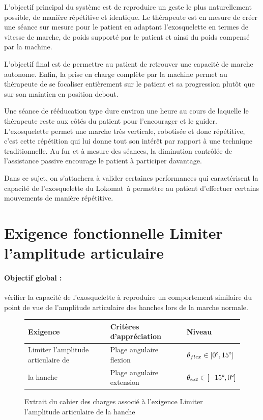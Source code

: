 L'objectif principal du système est de reproduire un geste le plus naturellement possible, de manière répétitive et identique. Le thérapeute est en mesure de créer une séance sur mesure pour le patient en adaptant l'exosquelette en termes de vitesse de marche, de poids supporté par le patient et ainsi du poids compensé par la machine.

L'objectif final est de permettre au patient de retrouver une capacité de marche autonome. Enfin, la prise en charge complète par la machine permet au thérapeute de se focaliser entièrement sur le patient et sa progression plutôt que sur son maintien en position debout.

Une séance de rééducation type dure environ une heure au cours de laquelle le thérapeute reste aux côtés du patient pour l'encourager et le guider. L'exosquelette permet une marche très verticale, robotisée et donc répétitive, c'est cette répétition qui lui donne tout son intérêt par rapport à une
technique traditionnelle. Au fur et à mesure des séances, la diminution contrôlée de l'assistance passive encourage le patient à participer davantage.

Dans ce sujet, on s'attachera à valider certaines performances qui caractérisent la capacité de l'exosquelette du Lokomat\textregistered\ à permettre au patient d'effectuer certains mouvements de manière répétitive.

\section{Exigence fonctionnelle \og Limiter l'amplitude articulaire\fg}

\paragraph{Objectif global :} vérifier la capacité de l'exosquelette à reproduire un comportement similaire du
point de vue de l'amplitude articulaire des hanches lors de la marche normale.

\begin{figure}[ht!]
\begin{tabular}{|m{}|m{}|m{}|}\hline
Exigence & Critères d'appréciation & Niveau \\
\hline
Limiter l'amplitude articulaire de & Plage angulaire flexion & $\theta_{flex}\in\left[0\degree,15\degree\right]$\\
la hanche & Plage angulaire extension & $\theta_{ext}\in\left[-15\degree,0\degree\right]$\\
\hline
\end{tabular}
\caption{\label{fig03} Extrait du cahier des charges associé à l'exigence
\og Limiter l'amplitude articulaire de la hanche \fg}
\end{figure}

